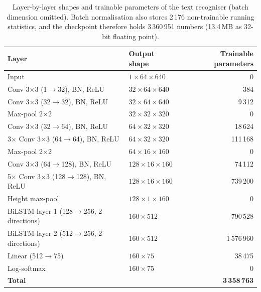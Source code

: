 \begin{table}[h]
\centering
\fontsize{9.5}{11.5}\selectfont
\begin{tabular}{|l|l|r|}
\hline
\textbf{Layer} & \textbf{Output shape} & \textbf{Trainable parameters} \\
\hline
Input & $1\times64\times640$ & 0 \\
Conv 3$\times$3 (1$\to$32), BN, ReLU & $32\times64\times640$ & 384 \\
Conv 3$\times$3 (32$\to$32), BN, ReLU & $32\times64\times640$ & 9\,312 \\
Max-pool 2$\times$2 & $32\times32\times320$ & 0 \\
Conv 3$\times$3 (32$\to$64), BN, ReLU & $64\times32\times320$ & 18\,624 \\
3$\times$ Conv 3$\times$3 (64$\to$64), BN, ReLU & $64\times32\times320$ & 111\,168 \\
Max-pool 2$\times$2 & $64\times16\times160$ & 0 \\
Conv 3$\times$3 (64$\to$128), BN, ReLU & $128\times16\times160$ & 74\,112 \\
5$\times$ Conv 3$\times$3 (128$\to$128), BN, ReLU & $128\times16\times160$ & 739\,200 \\
Height max-pool & $128\times1\times160$ & 0 \\
BiLSTM layer 1 (128$\to$256, 2 directions) & $160\times512$ & 790\,528 \\
BiLSTM layer 2 (512$\to$256, 2 directions) & $160\times512$ & 1\,576\,960 \\
Linear (512$\to$75) & $160\times75$ & 38\,475 \\
Log-softmax & $160\times75$ & 0 \\
\hline
\textbf{Total} & & \textbf{3\,358\,763} \\
\hline
\end{tabular}
\caption{Layer-by-layer shapes and trainable parameters of the text recogniser (batch dimension omitted). Batch normalisation also stores 2\,176 non-trainable running statistics, and the checkpoint therefore holds 3\,360\,951 numbers (13.4\,MB as 32-bit floating point).}
\label{tab:rec-layers}
\end{table}

